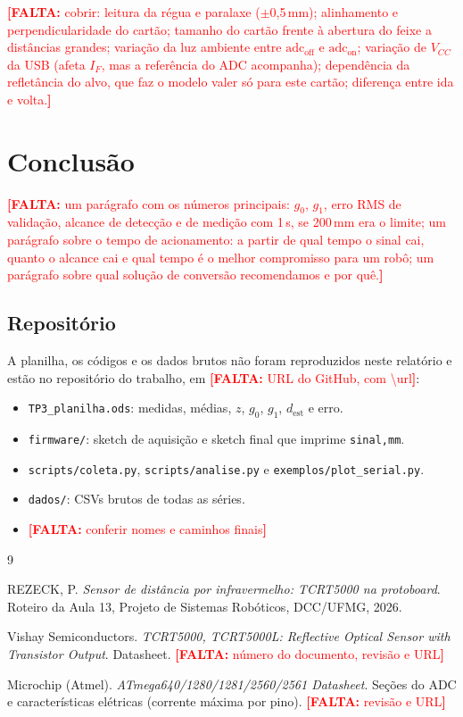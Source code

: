 \documentclass[11pt,a4paper]{article}
\newcommand{\pendente}[1]{\textcolor{red}{\textbf{[FALTA:} #1\textbf{]}}}
\begin{document}
\pendente{cobrir: leitura da régua e paralaxe ($\pm$0,5\,mm); alinhamento e perpendicularidade do cartão; tamanho do cartão frente à abertura do feixe a distâncias grandes; variação da luz ambiente entre $\text{adc}_\text{off}$ e $\text{adc}_\text{on}$; variação de $V_{CC}$ da USB (afeta $I_F$, mas a referência do ADC acompanha); dependência da refletância do alvo, que faz o modelo valer só para este cartão; diferença entre ida e volta.}

\section{Conclusão}
\label{sec:conclusao}

\pendente{um parágrafo com os números principais: $g_0$, $g_1$, erro RMS de validação, alcance de detecção e de medição com 1\,s, se 200\,mm era o limite; um parágrafo sobre o tempo de acionamento: a partir de qual tempo o sinal cai, quanto o alcance cai e qual tempo é o melhor compromisso para um robô; um parágrafo sobre qual solução de conversão recomendamos e por quê.}

\subsection*{Repositório}

A planilha, os códigos e os dados brutos não foram reproduzidos neste relatório e estão no repositório do trabalho, em \pendente{URL do GitHub, com \textbackslash url}:
\begin{itemize}[nosep]
  \item \texttt{TP3\_planilha.ods}: medidas, médias, $z$, $g_0$, $g_1$, $d_\text{est}$ e erro.
  \item \texttt{firmware/}: sketch de aquisição e sketch final que imprime \texttt{sinal,mm}.
  \item \texttt{scripts/coleta.py}, \texttt{scripts/analise.py} e \texttt{exemplos/plot\_serial.py}.
  \item \texttt{dados/}: CSVs brutos de todas as séries.
  \item \pendente{conferir nomes e caminhos finais}
\end{itemize}

\begin{thebibliography}{9}

REZECK, P. \textit{Sensor de distância por infravermelho: TCRT5000 na protoboard}. Roteiro da Aula 13, Projeto de Sistemas Robóticos, DCC/UFMG, 2026.

Vishay Semiconductors. \textit{TCRT5000, TCRT5000L: Reflective Optical Sensor with Transistor Output}. Datasheet. \pendente{número do documento, revisão e URL}

Microchip (Atmel). \textit{ATmega640/1280/1281/2560/2561 Datasheet}. Seções do ADC e características elétricas (corrente máxima por pino). \pendente{revisão e URL}

\end{thebibliography}
\end{document}

